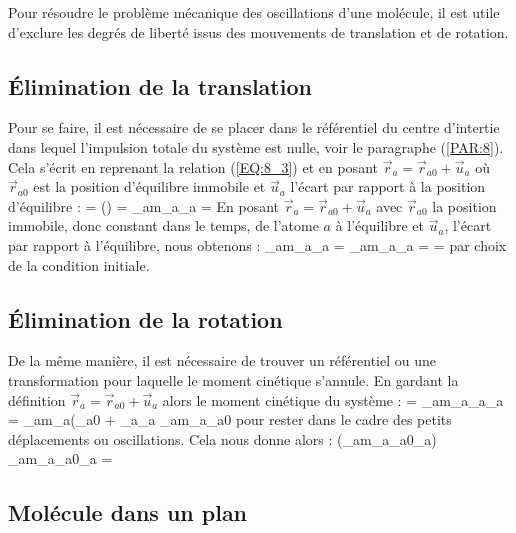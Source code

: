 Pour r\'esoudre le probl\`eme m\'ecanique des oscillations d'une mol\'ecule, il est utile d'exclure les degr\'es de libert\'e issus des mouvements de translation et de rotation.

\subsection{\'Elimination de la translation}

Pour se faire, il est n\'ecessaire de se placer dans le r\'ef\'erentiel du centre d'intertie dans lequel l'impulsion totale du syst\`eme est nulle, voir le paragraphe (\ref{PAR:8}). Cela s'\'ecrit en reprenant la relation (\ref{EQ:8_3}) et en posant $\vec{r}_{a} = \vec{r}_{a0} + \vec{u}_{a}$ o\`u $\vec{r}_{a0}$ est la position d'\'equilibre immobile et $\vec{u}_{a}$ l'\'ecart par rapport \`a la position d'\'equilibre :
\benn
	 = \left(\right) =  \Leftrightarrow \sum_{a}m_{a}_{a} = 
\eenn
En posant $\vec{r}_{a} = \vec{r}_{a0} + \vec{u}_{a}$ avec $\vec{r}_{a0}$ la position immobile, donc constant dans le temps, de l'atome $a$ \`a l'\'equilibre et $\vec{u}_{a}$, l'\'ecart par rapport \`a l'\'equilibre, nous obtenons :
\be
	\sum_{a}m_{a}_{a} =  \Leftrightarrow \sum_{a}m_{a}_{a} =  =  \label{EQ:24_1}
\ee
par choix de la condition initiale.

\subsection{\'Elimination de la rotation}

De la m\^eme mani\`ere, il est n\'ecessaire de trouver un r\'ef\'erentiel ou une transformation pour laquelle le moment cin\'etique s'annule. En gardant la d\'efinition $\vec{r}_{a} = \vec{r}_{a0} + \vec{u}_{a}$ alors le moment cin\'etique du syst\`eme :
\benn
	 = \sum_{a}m_{a}_{a}\wedge{}_{a} = \sum_{a}m_{a}(_{a0} + _{a}\wedge{}_{a} \approx \sum_{a}m_{a}_{a0}\wedge{}
\eenn
pour rester dans le cadre des petits d\'eplacements ou oscillations. Cela nous donne alors :
\be
	 \approx {}\left(\sum_{a}m_{a}_{a0}\wedge{}_{a}\right) \Rightarrow \sum_{a}m_{a}_{a0}\wedge{}_{a} =  \label{EQ:24_2}
\ee

\subsection{Mol\'ecule dans un plan}

